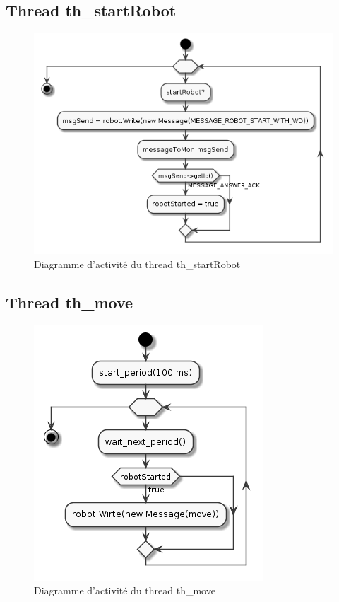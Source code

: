 \documentclass[11pt,a4paper]{paper}
\begin{document}
\subsection{Thread th\_startRobot}

 \begin{figure}[htbp]
\begin{center}
\includegraphics[scale=0.4]{figures_pdf/activity/th_startRobot}
\end{center}
\caption{Diagramme d'activité du thread th\_startRobot}
\end{figure}
\FloatBarrier

\subsection{Thread th\_move}

 \begin{figure}[htbp]
\begin{center}
\includegraphics[scale=0.4]{figures_pdf/activity/th_move}
\end{center}
\caption{Diagramme d'activité du thread th\_move}
\end{figure}
\FloatBarrier
\end{document}
